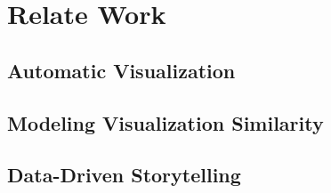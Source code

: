 \maketitle


\section{Relate Work} 
\subsection{Automatic Visualization} 
\subsection{Modeling Visualization Similarity} 
\subsection{Data-Driven Storytelling} 